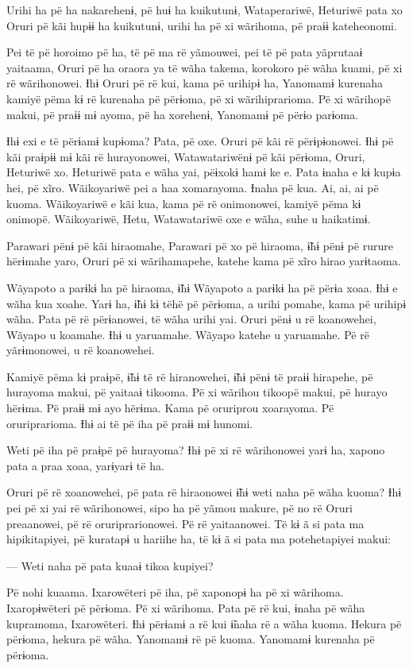 Urihi ha pë ha nakarehenɨ, pë huɨ ha kuikutunɨ, Wataperariwë, Heturiwë
pata xo Oruri pë kãi hupɨɨ ha kuikutunɨ, urihi ha pë xi wãrihoma, pë
praɨɨ kateheonomi. 

Pei të pë horoimo pë ha, të pë ma rë yãmouwei, pei të pë pata yãprutaaɨ
yaitaama, Oruri pë ha oraora ya të wãha takema, korokoro pë wãha kuami,
pë xi rë wãrihonowei. Ɨhɨ Oruri pë rë kui, kama pë urihipɨ ha, Yanomamɨ
kurenaha kamiyë pëma kɨ rë kurenaha pë përɨoma, pë xi wãrihiprarioma. Pë
xi wãrihopë makui, pë praɨɨ mɨ ayoma, pë ha xorehenɨ, Yanomamɨ pë përɨo
parɨoma. 

Ɨhɨ exi e të përɨamɨ kupɨoma? Pata, pë oxe. Oruri pë kãi rë
përɨpɨonowei. Ɨhɨ pë kãi praɨpɨɨ mɨ kãi rë hurayonowei, Watawatariwënɨ
pë kãi përɨoma, Oruri, Heturiwë xo. Heturiwë pata e wãha yai, pëɨxokɨ
hamɨ ke e. Pata ɨnaha e kɨ kupɨa hei, pë xĩro. Wãikoyariwë pei a haa
xomarayoma. Ɨnaha pë kua. Ai, ai, ai pë kuoma. Wãikoyariwë e kãi kua,
kama pë rë onimonowei, kamiyë pëma kɨ onimopë. Wãikoyariwë, Hetu,
Watawatariwë oxe e wãha, suhe u haikatimɨ. 

Parawari pënɨ pë kãi hiraomahe, Parawari pë xo pë hiraoma, ɨ̃hɨ pënɨ pë
rurure hërɨmahe yaro, Oruri pë xi wãrihamapehe, katehe kama pë xĩro
hirao yarɨtaoma. 

Wãyapoto a parɨkɨ ha pë hiraoma, ɨ̃hɨ Wãyapoto a parɨkɨ ha pë përɨa xoaa.
Ɨhɨ e wãha kua xoahe. Yarɨ ha, ɨ̃hɨ kɨ tëhë pë përɨoma, a urihi pomahe,
kama pë urihipɨ wãha. Pata pë rë përɨanowei, të wãha urihi yai. Oruri
pënɨ u rë koanowehei, Wãyapo u koamahe. Ɨhɨ u yaruamahe. Wãyapo katehe u
yaruamahe. Pë rë yãrɨmonowei, u rë koanowehei. 

Kamiyë pëma kɨ praɨpë, ɨ̃hɨ të rë hiranowehei, ɨ̃hɨ pënɨ të praɨɨ
hirapehe, pë hurayoma makui, pë yaitaaɨ tikooma. Pë xi wãrihou tikoopë
makui, pë hurayo hërɨma. Pë praɨɨ mɨ ayo hërɨma. Kama pë oruriprou
xoarayoma. Pë oruriprarioma. Ɨhɨ ai të pë iha pë praɨɨ mɨ hunomi. 

Weti pë iha pë praɨpë pë hurayoma? Ɨhɨ pë xi rë wãrihonowei yarɨ ha,
xapono pata a praa xoaa, yarɨyarɨ të ha. 

Oruri pë rë xoanowehei, pë pata rë hiraonowei ɨ̃hɨ weti naha pë wãha
kuoma? Ɨhɨ pei pë xi yai rë wãrihonowei, sipo ha pë yãmou makure, pë no
rë Oruri preaanowei, pë rë oruriprarionowei. Pë rë yaitaanowei. Të kɨ ã
si pata ma hipikitapiyei, pë kuratapɨ u hariihe ha, të kɨ ã si pata ma
potehetapiyei makui: 

--- Weti naha pë pata kuaaɨ tikoa kupiyei?

Pë nohi kuaama. Ixarowëteri pë iha, pë xaponopɨ ha pë xi wãrihoma.
Ixaropɨwëteri pë përɨoma. Pë xi wãrihoma. Pata pë rë kui, ɨnaha pë wãha
kupramoma, Ixarowëteri. Ɨhɨ përɨamɨ a rë kui ɨ̃naha rë a wãha kuoma.
Hekura pë përɨoma, hekura pë wãha. Yanomamɨ rë pë kuoma. Yanomamɨ
kurenaha pë përɨoma. 

